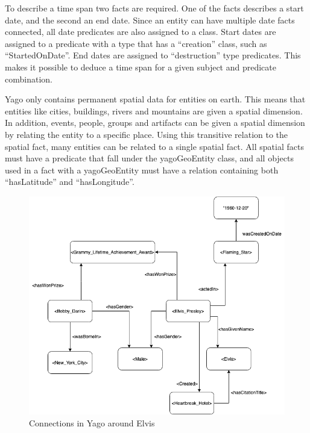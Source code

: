 To describe a time span two facts are required. One of the facts describes a start date, and the second an end date. Since an entity can have multiple date facts connected, all date predicates are also assigned to a class. Start dates are assigned to a predicate with a type that has a ``creation'' class, such as ``StartedOnDate''. End dates are assigned to ``destruction'' type predicates. This makes it possible to deduce a time span for a given subject and predicate combination\citep{yago}.

Yago only contains permanent spatial data for entities on earth. This means that entities like cities, buildings, rivers and mountains are given a spatial dimension. In addition, events, people, groups and artifacts can be given a spatial dimension by relating the entity to a specific place. Using this transitive relation to the spatial fact, many entities can be related to a single spatial fact. All spatial facts must have a predicate that fall under the yagoGeoEntity class, and all objects used in a fact with a yagoGeoEntity must have a relation containing both ``hasLatitude'' and ``hasLongitude''.

\begin{figure}[t]
  \centering
  \includegraphics[scale=0.5]{figs/yagoExample.png}
 \caption{Connections in Yago around Elvis}
 \label{fig:Elvis}
\end{figure}


